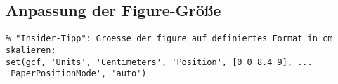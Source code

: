 \documentclass[threecolumn, 5pt, german]{latex4ei/latex4ei_sheet}
\begin{document}
	\begin{sectionbox}
	
		\subsection{Anpassung der Figure-Größe}
		
		\begin{lstlisting}
% "Insider-Tipp": Groesse der figure auf definiertes Format in cm skalieren:
set(gcf, 'Units', 'Centimeters', 'Position', [0 0 8.4 9], ...
'PaperPositionMode', 'auto')
		\end{lstlisting}
	\end{sectionbox}
	
\end{document}
